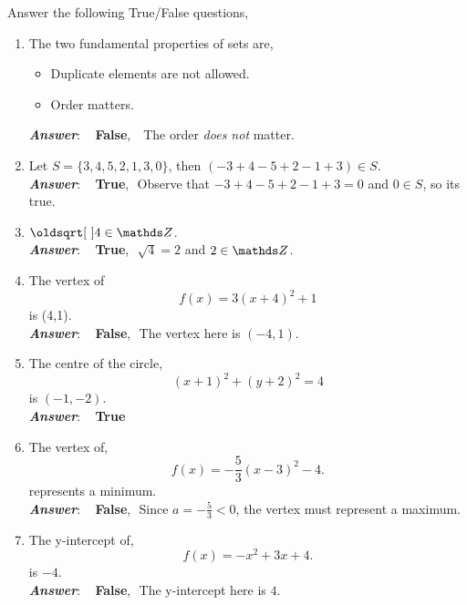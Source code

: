 \documentclass[12pt]{article} %
\begin{document}
\begin{qstn}[1] %
  Answer the following True/False questions,
  \begin{enumerate}
    \item The two fundamental properties of sets are,
      \begin{itemize}
        \item Duplicate elements are not allowed.
        \item Order matters.
      \end{itemize}
      \textbf{\emph{Answer}}: \,\,\, \textbf{False}, \,\, The order \emph{does not} matter.\\



    \item Let $S = \{3,4,5,2,1,3,0\} $, then $(-3+4-5+2-1+3) \in S$.\\
      \textbf{\emph{Answer}}: \,\,\, \textbf{True},\,\, Observe that $-3+4-5+2-1+3 = 0$ and $0 \in S$, so its true.\\


    \item $\sqrt{4} \in \Z$.\\
      \textbf{\emph{Answer}}: \,\,\, \textbf{True},\,\, $\sqrt{4} = 2$ and $2\in \Z$.\\



    \item The vertex of 
      \[
        f(x) = 3\left( x + 4 \right)^2 + 1 
      \] is (4,1).\\ 
      \textbf{\emph{Answer}}: \,\,\, \textbf{False},\,\, The vertex here is $(-4,1)$.\\



    \item The centre of the circle,
      \[
            (x+1)^2 + (y +2)^2 = 4
      \] is $(-1,-2)$.\\
      \textbf{\emph{Answer}}: \,\,\, \textbf{True}\\


    \item The vertex of,
      \[
            f(x) = -\frac{5}{3}\left( x - 3 \right)^2 - 4
      .\] represents a minimum.\\
      \textbf{\emph{Answer}}: \,\,\, \textbf{False},\,\, Since $a = -\frac{5}{3} < 0$, the vertex must represent a maximum.\\

    \item The y-intercept of,
      \[
              f(x) = -x^2 + 3x + 4
      .\] is $-4$.\\
      \textbf{\emph{Answer}}: \,\,\, \textbf{False},\,\, The y-intercept here is $4$.
  \end{enumerate}
\end{qstn}
\end{document}
